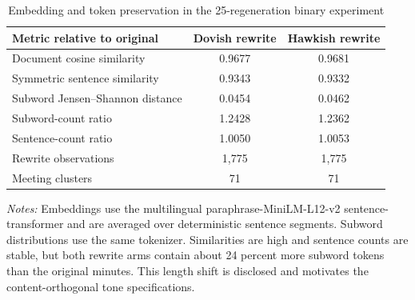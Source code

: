 \begin{table}[htbp]
\color{revisionred}
\centering
\begin{threeparttable}
\caption{Embedding and token preservation in the 25-regeneration binary experiment}
\label{tab:embedding-preservation}
\begin{scriptsize}
\begin{tabular}{lcc}
\toprule
Metric relative to original & Dovish rewrite & Hawkish rewrite \\
\midrule
Document cosine similarity & 0.9677 & 0.9681 \\
Symmetric sentence similarity & 0.9343 & 0.9332 \\
Subword Jensen--Shannon distance & 0.0454 & 0.0462 \\
Subword-count ratio & 1.2428 & 1.2362 \\
Sentence-count ratio & 1.0050 & 1.0053 \\
\midrule
Rewrite observations & 1,775 & 1,775 \\
Meeting clusters & 71 & 71 \\
\bottomrule
\end{tabular}
\begin{tablenotes}[flushleft]
\scriptsize
\item \textit{Notes:} Embeddings use the multilingual paraphrase-MiniLM-L12-v2 sentence-transformer and are averaged over deterministic sentence segments. Subword distributions use the same tokenizer. Similarities are high and sentence counts are stable, but both rewrite arms contain about 24 percent more subword tokens than the original minutes. This length shift is disclosed and motivates the content-orthogonal tone specifications.
\end{tablenotes}
\end{scriptsize}
\end{threeparttable}
\end{table}
